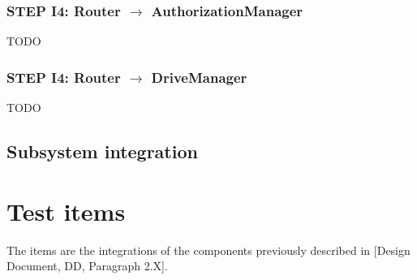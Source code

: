 \subsubsection{STEP I4: Router $\rightarrow$ AuthorizationManager}
TODO
\subsubsection{STEP I4: Router $\rightarrow$ DriveManager}
TODO

\subsection{Subsystem integration}

\section{Test items}
The items are the integrations of the components previously described in [Design Document, DD, Paragraph 2.X]. 
